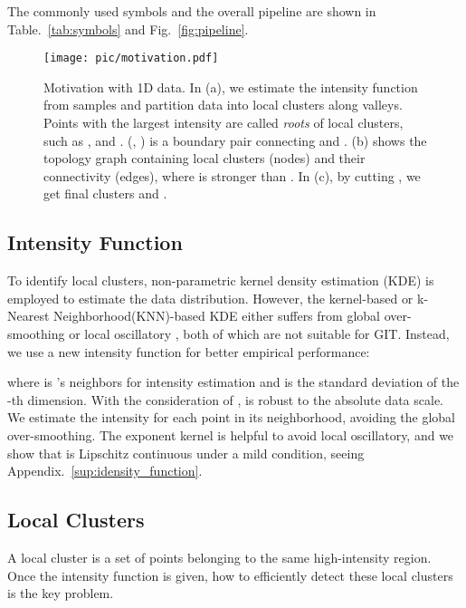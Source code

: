 \documentclass[letterpaper]{article} \usepackage{aaai22}  \usepackage{times}  \usepackage{helvet}  \usepackage{courier}  \usepackage[hyphens]{url}  \usepackage{graphicx} \urlstyle{rm} \def\UrlFont{\rm}  \usepackage{natbib}  \usepackage{caption} \DeclareCaptionStyle{ruled}{labelfont=normalfont,labelsep=colon,strut=off} \frenchspacing  \setlength{\pdfpagewidth}{8.5in}  \setlength{\pdfpageheight}{11in}  \usepackage{subfigure}
\begin{document}
The commonly used symbols and the overall pipeline are shown in Table.~\ref{tab:symbols} and Fig.~\ref{fig:pipeline}.

\begin{figure}[h]
    \centering
    \texttt{[image: pic/motivation.pdf]}
    \caption{Motivation with 1D data. In (a), we estimate the intensity function  from samples and partition data into local clusters  along valleys. Points with the largest intensity are called \textit{roots} of local clusters, such as ,  and . (, ) is a boundary pair connecting  and . (b) shows the topology graph containing local clusters (nodes) and their connectivity (edges), where  is stronger than . In (c), by cutting , we get final clusters  and .}
    \label{fig:motivation_1d}
\end{figure}


 


\subsection{Intensity Function}
To identify local clusters, non-parametric kernel density estimation (KDE) is employed to estimate the data distribution. However, the kernel-based \cite{parzen1962estimation, davis2011remarks} or k-Nearest Neighborhood(KNN)-based \cite{loftsgaarden1965nonparametric} KDE either suffers from global over-smoothing or local oscillatory \cite{yip2006dynamic}, both of which are not suitable for GIT. Instead, we use a new intensity function  for better empirical performance:

where  is 's neighbors for intensity estimation and  is the standard deviation of the -th dimension. With the consideration of ,  is robust to the absolute data scale. We estimate the intensity for each point in its neighborhood, avoiding the global over-smoothing. The exponent kernel is helpful to avoid local oscillatory, and we show that  is Lipschitz continuous under a mild condition, seeing Appendix.~\ref{sup:idensity_function}.


\subsection{Local Clusters}
\label{sec:local_cluster}
A local cluster is a set of points belonging to the same high-intensity region. Once the intensity function is given, how to efficiently detect these local clusters is the key problem.
\end{document}

